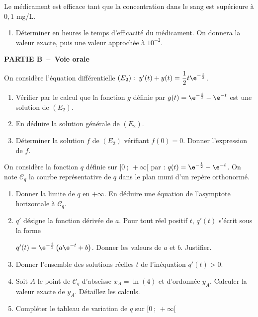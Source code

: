 \begin{exercice_cours}[\quad]{}
\begin{enumerate}[series=A, resume]
	\end{enumerate}

	Le médicament est efficace tant que la concentration dans le sang est supérieure à $0,1$ mg/L.
\begin{enumerate}[series=A, resume]
	\item Déterminer en heures le temps d'efficacité du médicament. On donnera la valeur exacte, puis une valeur approchée à $10^{-2}$.
\end{enumerate}

\medskip

\textbf{PARTIE B~--~Voie orale}

\medskip

On considère l'équation différentielle $(E_2):\;y'(t)+y(t)=\dfrac{1}{2}t\e^{-\frac{t}{2}}$.


\begin{enumerate}[series=A, resume]
	\item Vérifier par le calcul que la fonction $g$ définie par $g(t)=\e^{-\frac{t}{2}}-\e^{-t}$ est une solution de  $(E_2)$.
	\item En déduire la solution générale de $(E_2)$.
	\item Déterminer la solution $f$ de $(E_2)$ vérifiant $f(0)=0$. Donner l'expression de $f$.
\end{enumerate}

\medskip

On considère la fonction $q$ définie sur $[0~;~+\infty[$ par : $q(t)=\e^{-\frac{t}{2}}-\e^{-t}$. On note $\mathcal{C}_q$ la courbe représentative de $q$ dans le plan muni d'un repère orthonormé.

\begin{enumerate}[series=A, resume]
	\item Donner la limite de $q$ en $+\infty$. En déduire une équation de l'asymptote horizontale à $\mathcal{C}_q$.
	\item $q'$ désigne la fonction dérivée de $a$. Pour tout réel positif $t$, $q'(t)$ s'écrit sous la forme \par $q'(t)=\e^{-\frac{t}{2}}\left(a\e^{-t}+b\right)$. Donner les valeurs de $a$ et $b$. Justifier.
	\item Donner l'ensemble des solutions réelles $t$ de l'inéquation $q'(t)>0$.
	\item Soit $A$ le point de $\mathcal{C}_q$ d'abscisse $x_A=\ln(4)$ et d'ordonnée $y_A$. Calculer la valeur exacte de $y_A$. Détaillez les calculs.
	\item Compléter le tableau de variation de $q$ sur $[0~;~+\infty[$
\end{enumerate}


\end{exercice_cours}
